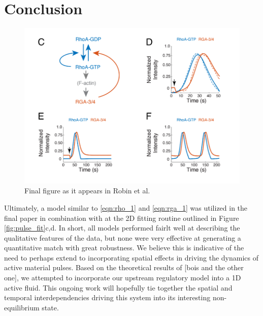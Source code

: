 \section{Conclusion}
\begin{figure}[h!]
\centering
\includegraphics[width=\hsize]{pulse/final_fig.png}
\caption{\label{fig:pulse_final}  Final figure as it appears in Robin et al.}
\end{figure}
Ultimately, a model similar to \ref{eqn:rho_1} and \ref{eqn:rga_1} was utilized in the final paper in combination with at the 2D fitting routine outlined in Figure \ref{fig:pulse_fit}c,d.   In short, all models performed fairlt well at describing the qualitative features of the data, but none were very effective at generating a quantitative match with great robustness.    We believe this is indicative of the need to perhaps extend to incorporating spatial effects in driving the dynamics of active material pulses.  Based on the theoretical results of [bois and the other one], we attempted to incorporate our upstream regulatory model into a 1D active fluid.  This ongoing work will hopefully tie together the spatial and temporal interdependencies driving this system into its interesting non-equilibrium state.


